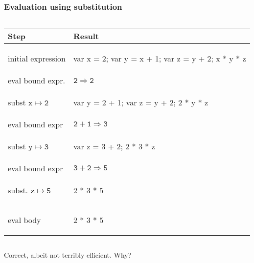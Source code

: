 \documentclass{beamer}
\begin{document}
\begin{frame}[fragile]
\frametitle{Evaluation using substitution}

\begin{columns}
\begin{column}{0.7\textwidth}
\begin{tabular}{ll}
\hline
Step & Result\\ 
\hline\hline \pause
initial expression 
&
\begin{teenycode}
var x = 2;
var y = x + 1;
var z = y + 2;
x * y * z
\end{teenycode} 
\\\hline \pause
eval bound expr. & {\footnotesize$\mathtt{2} \Rightarrow \mathtt{2}$}
\\\hline \pause
subst {\footnotesize$\mathtt{x}\mapsto\mathtt{2}$} 
&
\begin{teenycode}
var y = 2 + 1;
var z = y + 2;
2 * y * z
\end{teenycode}
\\\hline \pause
eval bound expr &
{\footnotesize$\mathtt{2 + 1 \Rightarrow 3}$}	
\\\hline \pause
subst {\footnotesize$\mathtt{y\mapsto 3}$} &
\begin{teenycode}
var z = 3 + 2;
2 * 3 * z
\end{teenycode}
\\\hline \pause
eval bound expr & {\footnotesize$\mathtt{3 + 2 \Rightarrow 5}$}
\\\hline \pause
subst. {\footnotesize$\mathtt{z\mapsto 5}$} & \begin{teenycode}
2 * 3 * 5
\end{teenycode}
\\\hline \pause
eval body & 	
\begin{teenycode}
2 * 3 * 5 %
\end{teenycode}
\end{tabular}
\end{column}
\end{columns}

\pause
\vfill
\noindent Correct, albeit not terribly efficient. Why?


\end{frame}
\end{document}
